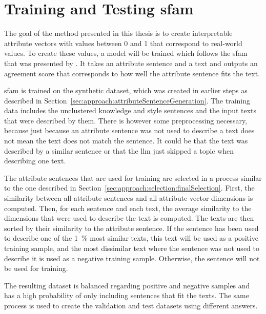 \section{Training and Testing \acs{sfam}}
\label{sec:approach:sfam}

The goal of the method presented in this thesis is to create interpretable attribute vectors with values between \num{0} and \num{1} that correspond to real-world values. To create these values, a model will be trained which follows the \acf{sfam} that was presented by \citet{patelLearningInterpretableStyle2023}. It takes an attribute sentence and a text and outputs an agreement score that corresponds to how well the attribute sentence fits the text.

\ac{sfam} is trained on the synthetic dataset, which was created in earlier steps as described in Section~\ref{sec:approach:attributeSentenceGeneration}. The training data includes the unclustered knowledge and style sentences and the input texts that were described by them. There is however some preprocessing necessary, because just because an attribute sentence was not used to describe a text does not mean the text does not match the sentence. It could be that the text was described by a similar sentence or that the \ac{llm} just skipped a topic when describing one text.

The attribute sentences that are used for training are selected in a process similar to the one described in Section~\ref{sec:approach:selection:finalSelection}.
First, the similarity between all attribute sentences and all attribute vector dimensions is computed. Then, for each sentence and each text, the average similarity to the dimensions that were used to describe the text is computed. The texts are then sorted by their similarity to the attribute sentence. If the sentence has been used to describe one of the \SI{1}{\percent} most similar texts, this text will be used as a positive training sample, and the most dissimilar text where the sentence was not used to describe it is used as a negative training sample. Otherwise, the sentence will not be used for training.

The resulting dataset is balanced regarding positive and negative samples and has a high probability of only including sentences that fit the texts. %
The same process is used to create the validation and test datasets using different answers. %

